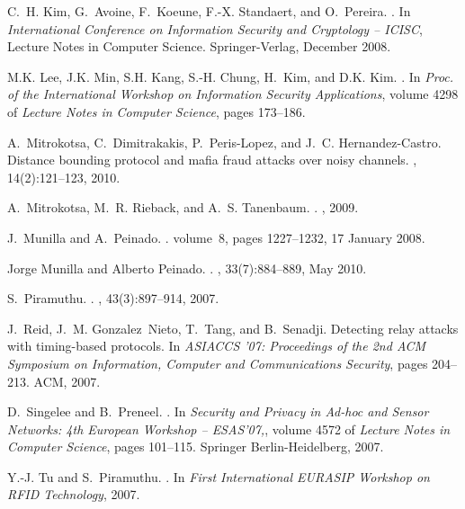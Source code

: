 \documentclass{article}
\begin{document}
\begin{thebibliography}{99}
C.~H. Kim, G.~Avoine, F.~Koeune, F.-X. Standaert, and O.~Pereira.
.
\newblock In {\em International Conference on Information Security and
  Cryptology -- ICISC}, Lecture Notes in Computer Science. Springer-Verlag,
  December 2008.

M.K. Lee, J.K. Min, S.H. Kang, S.-H. Chung, H.~Kim, and D.K. Kim.
.
\newblock In {\em Proc. of the International Workshop on Information Security
  Applications}, volume 4298 of {\em Lecture Notes in Computer Science}, pages
  173--186.

A.~Mitrokotsa, C.~Dimitrakakis, P.~Peris-Lopez, and J.~C. Hernandez-Castro.
\newblock Distance bounding protocol and mafia fraud attacks over noisy
  channels.
, 14(2):121--123, 2010.

A.~Mitrokotsa, M.~R. Rieback, and A.~S. Tanenbaum.
.
, 2009.

J.~Munilla and A.~Peinado.
.
\newblock volume~8, pages 1227--1232, 17 January 2008.

Jorge Munilla and Alberto Peinado.
.
, 33(7):884--889, May 2010.

S.~Piramuthu.
.
, 43(3):897--914, 2007.

J.~Reid, J.~M. Gonzalez~Nieto, T.~Tang, and B.~Senadji.
\newblock Detecting relay attacks with timing-based protocols.
\newblock In {\em ASIACCS '07: Proceedings of the 2nd ACM Symposium on
  Information, Computer and Communications Security}, pages 204--213. ACM,
  2007.

D.~Singelee and B.~Preneel.
.
\newblock In {\em Security and Privacy in Ad-hoc and Sensor Networks: 4th
  European Workshop -- ESAS'07,}, volume 4572 of {\em Lecture Notes in Computer
  Science}, pages 101--115. Springer Berlin-Heidelberg, 2007.

Y.-J. Tu and S.~Piramuthu.
.
\newblock In {\em First International EURASIP Workshop on RFID Technology},
  2007.

\end{thebibliography}
\end{document}
